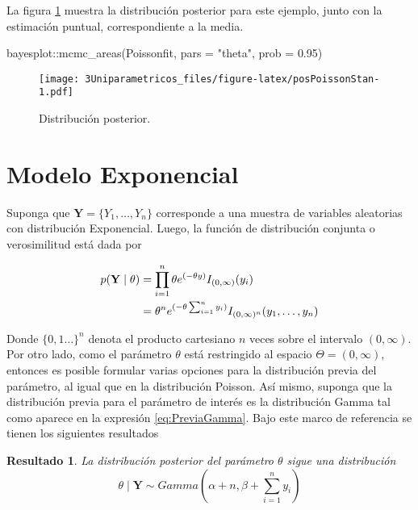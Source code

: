 \documentclass[
  10pt,
  spanish,
]{book}
\newenvironment{Shaded}{\begin{snugshade}}{\end{snugshade}}
\newcommand{\AttributeTok}[1]{\textcolor[rgb]{0.77,0.63,0.00}{#1}}
\newcommand{\FloatTok}[1]{\textcolor[rgb]{0.00,0.00,0.81}{#1}}
\newcommand{\FunctionTok}[1]{\textcolor[rgb]{0.00,0.00,0.00}{#1}}
\newcommand{\NormalTok}[1]{#1}
\newcommand{\SpecialCharTok}[1]{\textcolor[rgb]{0.00,0.00,0.00}{#1}}
\newcommand{\StringTok}[1]{\textcolor[rgb]{0.31,0.60,0.02}{#1}}
\newtheorem{proposition}{Resultado}[chapter]
\theoremstyle{definition}
\theoremstyle{definition}
\theoremstyle{definition}
\theoremstyle{definition}
\theoremstyle{remark}
\begin{document}
La figura \ref{fig:posPoissonStan} muestra la distribución posterior para este ejemplo, junto con la estimación puntual, correspondiente a la media.

\begin{Shaded}
\begin{Highlighting}[]
\NormalTok{bayesplot}\SpecialCharTok{::}\FunctionTok{mcmc\_areas}\NormalTok{(Poissonfit, }\AttributeTok{pars =} \StringTok{"theta"}\NormalTok{, }
                      \AttributeTok{prob =} \FloatTok{0.95}\NormalTok{)}
\end{Highlighting}
\end{Shaded}

\begin{figure}
\centering
\texttt{[image: 3Uniparametricos\_files/figure-latex/posPoissonStan-1.pdf]}
\caption{\label{fig:posPoissonStan}Distribución posterior.}
\end{figure}

\hypertarget{modelo-exponencial}{%
\section{Modelo Exponencial}\label{modelo-exponencial}}

Suponga que \(\mathbf{Y}=\{Y_1,\ldots,Y_n\}\) corresponde a una muestra de variables aleatorias con distribución Exponencial. Luego, la función de distribución conjunta o verosimilitud está dada por

\begin{align}
p(\mathbf{Y} \mid \theta)&=\prod_{i=1}^n\theta e^{(-\theta y)}I_{(0,\infty)}(y_i) \notag \\
&=\theta^n e^{(-\theta \sum_{i=1}^ny_i)}I_{(0,\infty)^n}(y_1,\ldots,y_n)
\end{align}

Donde \(\{0,1\ldots\}^n\) denota el producto cartesiano \(n\) veces sobre el intervalo \((0,\infty)\). Por otro lado, como el parámetro \(\theta\) está restringido al espacio \(\Theta=(0,\infty)\), entonces es posible formular varias opciones para la distribución previa del parámetro, al igual que en la distribución Poisson. Así mismo, suponga que la distribución previa para el parámetro de interés es la distribución Gamma tal como aparece en la expresión \eqref{eq:PreviaGamma}. Bajo este marco de referencia se tienen los siguientes resultados

\begin{proposition}
\protect\hypertarget{prp:unnamed-chunk-53}{}{\label{prp:unnamed-chunk-53} }La distribución posterior del parámetro \(\theta\) sigue una distribución
\begin{equation*}
\theta \mid \mathbf{Y} \sim Gamma\left(\alpha+n,\beta+\sum_{i=1}^ny_i\right)
\end{equation*}
\end{proposition}
\end{document}
